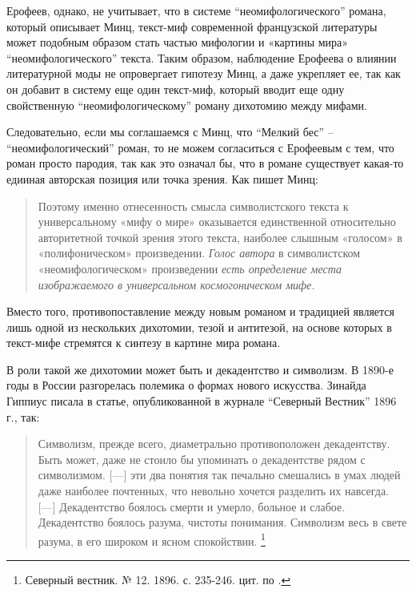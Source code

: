 \documentclass[12pt,a4paper]{article}
\begin{document}
Ерофеев, однако, не учитывает, что в системе \enquote{неомифологического} романа, который описывает Минц, текст-миф современной французской литературы может подобным образом стать частью мифологии и «картины мира» \enquote{неомифологического} текста. Таким образом, наблюдение Ерофеева о влиянии литературной моды не опровергает гипотезу Минц, а даже укрепляет ее, так как он добавит в систему еще один текст-миф, который вводит еще одну свойственную \enquote{неомифологическому} роману дихотомию между мифами.

Следовательно, если мы соглашаемся с Минц, что \enquote{Мелкий бес} -- \enquote{неомифологический} роман, то не можем согласиться с Ерофеевым с тем, что роман просто пародия, так как это означал бы, что в романе существует какая-то едииная авторская позиция или точка зрения. Как пишет Минц:

\begin{quote}
Поэтому именно отнесенность смысла символистского текста к универсальному «мифу о мире» оказывается единственной относительно авторитетной точкой зрения этого текста, наиболее слышным «голосом» в «полифоническом» произведении. \emph{Голос автора} в символистском «неомифологическом» произведении \emph{есть определение места изображаемого в универсальном космогоническом мифе.}
\parencite[77.]{mints2004}
\end{quote}

Вместо того, противопоставление между новым романом и традицией является лишь одной из нескольких дихотомии, тезой и антитезой, на основе которых в текст-мифе стремятся к синтезу в картине мира романа.

В роли такой же дихотомии может быть и декадентство и символизм. В 1890-е годы в России разгорелась полемика о формах нового искусства. Зинайда Гиппиус писала в статье, опубликованной в журнале \enquote{Северный Вестник} 1896 г., так: 

\begin{quote}
Символизм, прежде всего, диаметрально противоположен декадентству. Быть может, даже не стоило бы упоминать о декадентстве рядом с символизмом. [---] эти два понятия так печально смешались в умах людей даже наиболее почтенных, что невольно хочется разделить их навсегда. [---] Декадентство боялось смерти и умерло, больное и слабое. Декадентство боялось разума, чистоты понимания. Символизм весь в свете разума, в его широком и ясном спокойствии. \footnote{Северный вестник. № 12. 1896. с. 235-246. цит. по \cite[150]{pavlova2007}.}
\end{quote}
\end{document}
